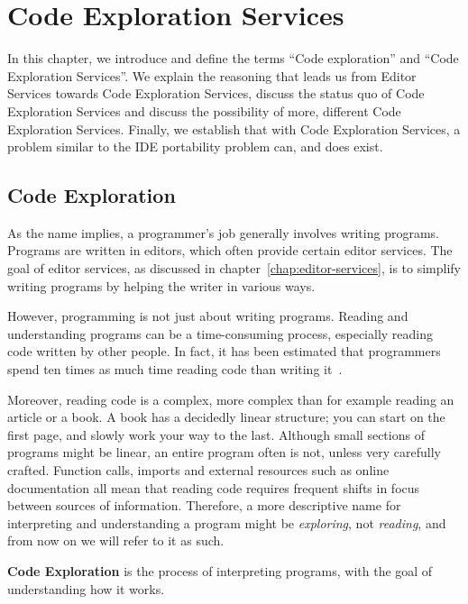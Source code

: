

\chapter{Code Exploration Services}
\label{chap:code-exploration-services}

In this chapter, we introduce and define the terms ``Code exploration'' and ``Code Exploration Services''.
We explain the reasoning that leads us from Editor Services towards Code Exploration Services,
discuss the status quo of Code Exploration Services and
discuss the possibility of more, different Code Exploration Services.
Finally, we establish that with Code Exploration Services, a problem similar to the \ac{IDE} portability problem can, and does exist.


\section{Code Exploration}

As the name implies, a programmer's job generally involves writing programs.
Programs are written in editors, which often provide certain editor services.
The goal of editor services, as discussed in chapter~\ref{chap:editor-services}, is to simplify writing programs by helping the writer in various ways.

However, programming is not just about writing programs.
Reading and understanding programs can be a time-consuming process, especially reading code written by other people.
In fact, it has been estimated that programmers spend ten times as much time reading code than writing it~\autocite{clean_code}.

Moreover, reading code is a complex, more complex than for example reading an article or a book.
A book has a decidedly linear structure; you can start on the first page, and slowly work your way to the last.
Although small sections of programs might be linear, an entire program often is not, unless very carefully crafted.
Function calls, imports and external resources such as online documentation all mean that reading code requires frequent shifts in focus between sources of information.
Therefore, a more descriptive name for interpreting and understanding a program might be \textit{exploring}, not \textit{reading}, and from now on we will refer to it as such.

\begin{definition}
    \textbf{Code Exploration} is the process of interpreting programs, with the goal of understanding how it works.
\end{definition}

